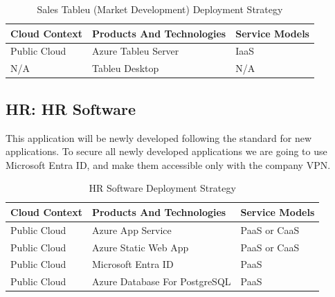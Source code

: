 \documentclass{llncs}
\begin{document}
\begin{table}[h!]
    \centering
    \begin{tabular}{lll}
        \hline
        \textbf{Cloud Context} & \textbf{Products And Technologies} & \textbf{Service Models} \\
        \hline
        Public Cloud           & Azure Tableu Server                & IaaS                    \\
        N/A                    & Tableu Desktop                     & N/A                     \\
    \end{tabular}
    \caption{Sales Tableu (Market Development) Deployment Strategy}
\end{table}

\subsection{HR: HR Software}
This application will be newly developed following the standard for new applications.
To secure all newly developed applications we are going to use Microsoft Entra ID, and make them accessible only with the company VPN.\\

\begin{table}[h!]
    \centering
    \begin{tabular}{lll}
        \hline
        \textbf{Cloud Context} & \textbf{Products And Technologies} & \textbf{Service Models} \\
        \hline
        Public Cloud           & Azure App Service                  & PaaS or CaaS            \\
        \hline
        Public Cloud           & Azure Static Web App               & PaaS or CaaS            \\

        \hline
        Public Cloud           & Microsoft Entra ID                 & PaaS                    \\
        \hline
        Public Cloud           & Azure Database For PostgreSQL      & PaaS                    \\
        \hline
    \end{tabular}
    \caption{HR Software Deployment Strategy}
\end{table}
\end{document}
